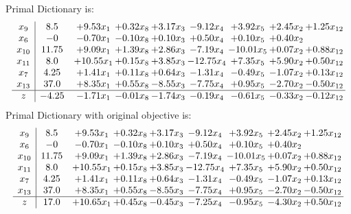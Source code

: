 \documentclass[8pt]{article}
\begin{document}
Primal Dictionary is:
\[\begin{array}{c| c c@{\hskip 2pt} c@{\hskip 2pt} c@{\hskip 2pt} c@{\hskip 2pt} c@{\hskip 2pt} c@{\hskip 2pt} c@{\hskip 2pt} }
 x_{9}   &  8.5 & +  9.53 x_{1} & +  0.32 x_{8} & +  3.17 x_{3} & -9.12 x_{4} & +  3.92 x_{5} & +  2.45 x_{2} & +  1.25 x_{12}\\
 x_{6}   &  -0 & -0.70 x_{1} & -0.10 x_{8} & +  0.10 x_{3} & +  0.50 x_{4} & +  0.10 x_{5} & +  0.40 x_{2} &   \\
 x_{10}   &  11.75 & +  9.09 x_{1} & +  1.39 x_{8} & +  2.86 x_{3} & -7.19 x_{4} & -10.01 x_{5} & +  0.07 x_{2} & +  0.88 x_{12}\\
 x_{11}   &  8.0 & + 10.55 x_{1} & +  0.15 x_{8} & +  3.85 x_{3} & -12.75 x_{4} & +  7.35 x_{5} & +  5.90 x_{2} & +  0.50 x_{12}\\
 x_{7}   &  4.25 & +  1.41 x_{1} & +  0.11 x_{8} & +  0.64 x_{3} & -1.31 x_{4} & -0.49 x_{5} & -1.07 x_{2} & +  0.13 x_{12}\\
 x_{13}   &  37.0 & +  8.35 x_{1} & +  0.55 x_{8} & -8.55 x_{3} & -7.75 x_{4} & +  0.95 x_{5} & -2.70 x_{2} & -0.50 x_{12}\\
\hline
z    &  -4.25 & -1.71 x_{1} & -0.01 x_{8} & -1.74 x_{3} & -0.19 x_{4} & -0.61 x_{5} & -0.33 x_{2} & -0.12 x_{12}\\
\end{array}\]
Primal Dictionary with original objective is:
\[\begin{array}{c| c c@{\hskip 2pt} c@{\hskip 2pt} c@{\hskip 2pt} c@{\hskip 2pt} c@{\hskip 2pt} c@{\hskip 2pt} c@{\hskip 2pt} }
 x_{9}   &  8.5 & +  9.53 x_{1} & +  0.32 x_{8} & +  3.17 x_{3} & -9.12 x_{4} & +  3.92 x_{5} & +  2.45 x_{2} & +  1.25 x_{12}\\
 x_{6}   &  -0 & -0.70 x_{1} & -0.10 x_{8} & +  0.10 x_{3} & +  0.50 x_{4} & +  0.10 x_{5} & +  0.40 x_{2} &   \\
 x_{10}   &  11.75 & +  9.09 x_{1} & +  1.39 x_{8} & +  2.86 x_{3} & -7.19 x_{4} & -10.01 x_{5} & +  0.07 x_{2} & +  0.88 x_{12}\\
 x_{11}   &  8.0 & + 10.55 x_{1} & +  0.15 x_{8} & +  3.85 x_{3} & -12.75 x_{4} & +  7.35 x_{5} & +  5.90 x_{2} & +  0.50 x_{12}\\
 x_{7}   &  4.25 & +  1.41 x_{1} & +  0.11 x_{8} & +  0.64 x_{3} & -1.31 x_{4} & -0.49 x_{5} & -1.07 x_{2} & +  0.13 x_{12}\\
 x_{13}   &  37.0 & +  8.35 x_{1} & +  0.55 x_{8} & -8.55 x_{3} & -7.75 x_{4} & +  0.95 x_{5} & -2.70 x_{2} & -0.50 x_{12}\\
\hline
z    &  17.0 & + 10.65 x_{1} & +  0.45 x_{8} & -0.45 x_{3} & -7.25 x_{4} & -0.95 x_{5} & -4.30 x_{2} & +  0.50 x_{12}\\
\end{array}\]
\end{document}

